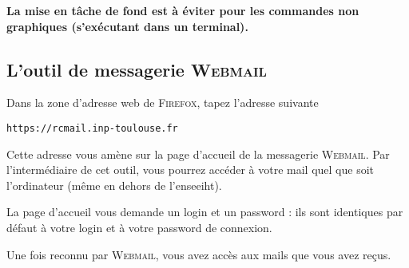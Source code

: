 \documentclass[a4paper,11pt]{article}
\newcommand{\netscape}{\textsc{Firefox}\xspace}
\begin{document}
\begin{danger}
  \textbf{La mise en tâche de fond est à éviter pour les commandes non
  graphiques (s'exécutant dans un terminal).}
\end{danger}

\subsection{L'outil de messagerie \textsc{Webmail}}

Dans la zone d'adresse web de \netscape, tapez l'adresse suivante

\begin{verbatim}
https://rcmail.inp-toulouse.fr
\end{verbatim}

% 

Cette adresse vous amène sur la page d'accueil de la messagerie
\textsc{Webmail}. Par l'intermédiaire de cet outil, vous pourrez
accéder à votre mail quel que soit l'ordinateur (même en dehors de l'enseeiht).

La page d'accueil vous demande un login et un password : ils sont identiques
par défaut à votre login et à votre password de connexion.


Une fois reconnu par \textsc{Webmail}, vous avez accès aux mails que vous avez
reçus.
\end{document}
